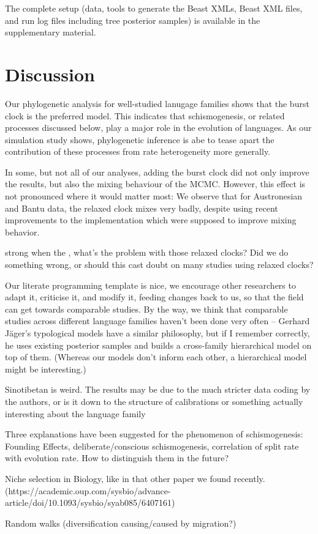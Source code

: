 \documentclass[a4paper,12pt]{scrartcl}
\begin{document}
The complete setup (data, tools to generate the Beast XMLs, Beast XML files, and
run log files including tree posterior samples) is available in the
supplementary material.

\section{Discussion}

Our phylogenetic analysis for well-studied lanugage families shows that the
burst clock is the preferred model. This indicates that schismogenesis, or
related processes discussed below, play a major role in the evolution of
languages. As our simulation study shows, phylogenetic inference is abe to tease
apart the contribution of these processes from rate heterogeneity more
generally.

In some, but not all of our analyses, adding the burst clock did not only
improve the results, but also the mixing behaviour of the MCMC. However, this
effect is not pronounced where it would matter most: We observe that for
Austronesian and Bantu data, the relaxed clock mixes very badly, despite using
recent improvements to the implementation which were supposed to improve mixing
behavior.

strong when the , what's the problem with those relaxed clocks? Did we do
something wrong, or should this cast doubt on many studies using relaxed clocks?

Our literate programming template is nice, we encourage other researchers to
adapt it, criticise it, and modify it, feeding changes back to us, so that the
field can get towards comparable studies. By the way, we think that comparable
studies across different language families haven't been done very often –
Gerhard Jäger's typological models have a similar philosophy, but if I remember
correctly, he uses existing posterior samples and builds a cross-family
hierarchical model on top of them. (Whereas our models don't inform each other,
a hierarchical model might be interesting.)

Sinotibetan is weird. The results may be due to the much stricter data coding by
the authors, or is it down to the structure of calibrations or something
actually interesting about the language family

Three explanations have been suggested for the phenomenon of schismogenesis:
Founding Effects, deliberate/conscious schismogenesis,
correlation of split rate with evolution rate. How
to distinguish them in the future?

Niche selection in Biology, like in that other paper we found recently.
(https://academic.oup.com/sysbio/advance-article/doi/10.1093/sysbio/syab085/6407161)

Random walks (diversification causing/caused by migration?) \parencite{neureitercan}

\printbibliography{}
\end{document}
